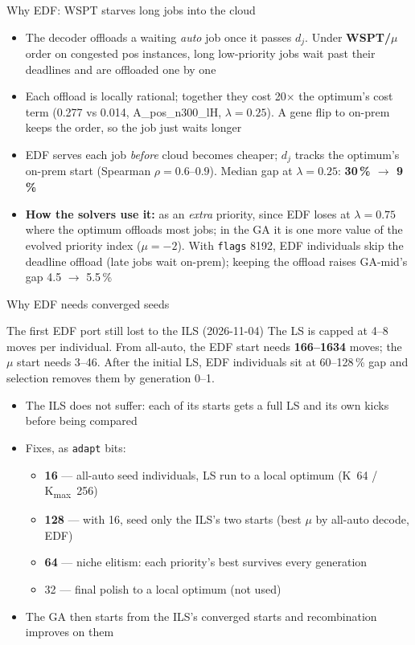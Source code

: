 \documentclass[aspectratio=169,t]{beamer}
\newcommand{\code}[1]{\texttt{#1}}
\begin{document}
\begin{frame}{Why EDF: WSPT starves long jobs into the cloud}
  \begin{itemize}
    \item The decoder offloads a waiting \emph{auto} job once it passes $d_j$.
      Under \textbf{WSPT/$\mu$} order on congested pos instances, long
      low-priority jobs wait past their deadlines and are offloaded one by one
    \item Each offload is locally rational; together they cost
      \alert{20$\times$} the optimum's cost term (0.277 vs 0.014,
      A\_pos\_n300\_lH, $\lambda{=}0.25$). A gene flip to on-prem keeps the
      order, so the job just waits longer
    \item EDF serves each job \emph{before} cloud becomes cheaper; $d_j$
      tracks the optimum's on-prem start (Spearman $\rho = 0.6$--$0.9$).
      Median gap at $\lambda{=}0.25$: \textbf{30\,\% $\to$ 9\,\%}
    \item \textbf{How the solvers use it:} as an \emph{extra} priority, since
      EDF loses at $\lambda{=}0.75$ where the optimum offloads most jobs; in
      the GA it is one more value of the evolved priority index ($\mu=-2$).
      With \code{flags} 8192, EDF individuals skip the deadline offload (late
      jobs wait on-prem); keeping the offload raises GA-mid's gap 4.5 $\to$
      5.5\,\%
  \end{itemize}
\end{frame}

\begin{frame}{Why EDF needs converged seeds}
  \begin{alertblock}{The first EDF port still lost to the ILS (2026-11-04)}
    The LS is capped at 4--8 moves per individual. From all-auto, the EDF
    start needs \textbf{166--1634} moves; the $\mu$ start needs 3--46. After
    the initial LS, EDF individuals sit at 60--128\,\% gap and selection
    removes them by generation 0--1.
  \end{alertblock}
  \begin{itemize}
    \item The ILS does not suffer: each of its starts gets a full LS and its
      own kicks before being compared
    \item Fixes, as \code{adapt} bits:
    \begin{itemize}
      \item \textbf{16} --- all-auto seed individuals, LS run to a local
        optimum (K~64 / K\textsubscript{max}~256)
      \item \textbf{128} --- with 16, seed only the ILS's two starts (best
        $\mu$ by all-auto decode, EDF)
      \item \textbf{64} --- niche elitism: each priority's best survives
        every generation
      \item 32 --- final polish to a local optimum (not used)
    \end{itemize}
    \item The GA then starts from the ILS's converged starts and
      recombination improves on them
  \end{itemize}
\end{frame}
\end{document}
